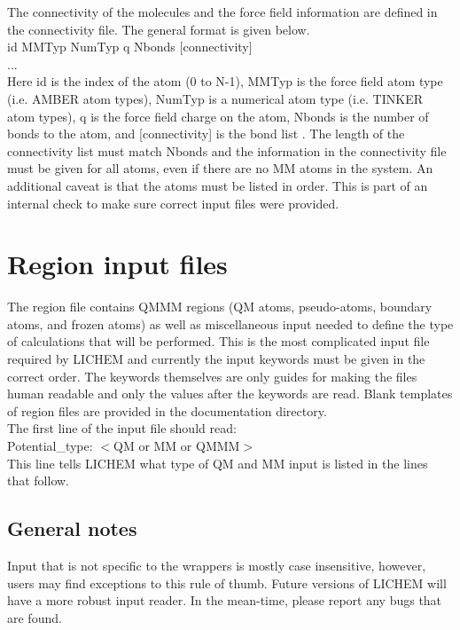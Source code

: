 \documentclass[12pt]{report}
\begin{document}
The connectivity of the molecules and the force field information are defined
in the connectivity file. The general format is given below. \\

id MMTyp NumTyp q Nbonds [connectivity] \\
... \\

Here id is the index of the atom (0 to N-1), MMTyp is the force field atom
type (i.e. AMBER atom types), NumTyp is a numerical atom type (i.e. TINKER
atom types), q is the force field charge on the atom, Nbonds is the number of
bonds to the atom, and [connectivity] is the bond list . The length of the
connectivity list must match Nbonds and the information in the connectivity
file must be given for all atoms, even if there are no MM atoms in the system.
An additional caveat is that the atoms must be listed in order. This is part
of an internal check to make sure correct input files were provided.

\section{Region input files}

The region file contains QMMM regions (QM atoms, pseudo-atoms, boundary atoms,
and frozen atoms) as well as miscellaneous input needed to define the type
of calculations that will be performed. This is the most complicated input
file required by LICHEM and currently the input keywords must be given in the
correct order. The keywords themselves are only guides for making the files
human readable and only the values after the keywords are read. Blank templates
of region files are provided in the documentation directory. \\

The first line of the input file should read: \\

Potential\_type: $<$QM or MM or QMMM$>$ \\

This line tells LICHEM what type of QM and MM input is listed in the lines that
follow.

\subsection{General notes}

Input that is not specific to the wrappers is mostly case insensitive,
however, users may find exceptions to this rule of thumb. Future versions of
LICHEM will have a more robust input reader. In the mean-time, please report
any bugs that are found.
\end{document}
